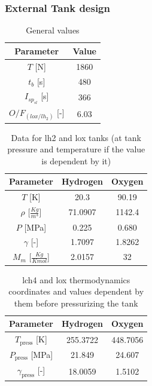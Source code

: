 \subsubsection*{External Tank design}
\begin{table}[H]
    \centering
    \begin{tabular}{|c|c|}\hline
    \textbf{Parameter} & \textbf{Value} \\ \hline
    $T$ [N] & 1860  \\\hline
    $t_b$ [s] & 480\\\hline
    $I_{sp_{sl}}$ [s] & 366\\\hline
    $O/F_{(lox/lh_2)}$ [-] & 6.03\\\hline
    \end{tabular}
    \caption{General values}
    \label{tab:tank_gen_val}
\end{table}
\begin{table}[H]
    \centering
    \begin{tabular}{|c|c|c|}\hline
    \textbf{Parameter} & \textbf{Hydrogen} & \textbf{Oxygen} \\ \hline
    $T$ [K] & 20.3 & 90.19\\ \hline
    $\rho$ [$\frac{Kg}{m^3}$]& 71.0907& 1142.4\\ \hline
    $P$ [MPa] & 0.225 & 0.680\\ \hline
    $\gamma$ [-] & 1.7097& 1.8262\\ \hline
    $M_m$ [$\frac{Kg}{Kmol}$] & 2.0157& 32\\ \hline
\end{tabular}
    \caption{Data for \acrshort{lh2} and \acrshort{lox} tanks (at tank pressure and temperature if the value is dependent by it)}
    \label{tab:data_tank_lh2_lox}
\end{table}
\begin{table}[H]
    \centering
    \begin{tabular}{|c|c|c|}\hline
        \textbf{Parameter} & \textbf{Hydrogen} & \textbf{Oxygen} \\ \hline
    $T_{\text{press}} $  [K] & 255.3722 & 448.7056 \\ \hline
    $P_{\text{press}}$ [MPa] & 21.849 & 24.607 \\ \hline
    $\gamma_{\text{press}}$ [-] & 18.0059 & 1.5102\\ \hline
\end{tabular}
    \caption{\acrshort{lch4} and \acrshort{lox} thermodynamics coordinates and values dependent by them before pressurizing the tank}
    \label{tab:data_press_lh2_lox}
\end{table}
